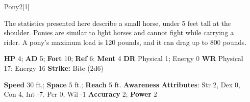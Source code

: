   \begin{monsection}{Pony}{2}[1]
    \vspace{-1em}\vspace{-1em}
    \vspace{0em}

    
      The statistics presented here describe a small horse, under 5 feet tall at the shoulder.
      Ponies are similar to light horses and cannot fight while carrying a rider.
      A pony's maximum load is 120 pounds, and it can drag up to 800 pounds.
    

    \begin{spellcontent}
      \begin{spelltargetinginfo}
        \pari \textbf{HP} 4;
          \textbf{AD} 5;
          \textbf{Fort} 10;
          \textbf{Ref} 6;
          \textbf{Ment} 4
        \pari \textbf{DR} Physical 1; Energy 0
        \pari \textbf{WR} Physical 17; Energy 16
        \pari \textbf{Strike:}
            Bite  (2d6)
      \end{spelltargetinginfo}
    \end{spellcontent}
    \begin{monsterfooter}
      \pari \textbf{Speed} 30 ft.;
        \textbf{Space} 5 ft.;
        \textbf{Reach} 5 ft.
      \pari \textbf{Awareness} 
      \pari \textbf{Attributes}:
        Str 2, Dex 0,
        Con 4, Int -7,
        Per 0, Wil -1
      \pari \textbf{Accuracy} 2;
        \textbf{Power} 2
    \end{monsterfooter}
  \end{monsection}
  
